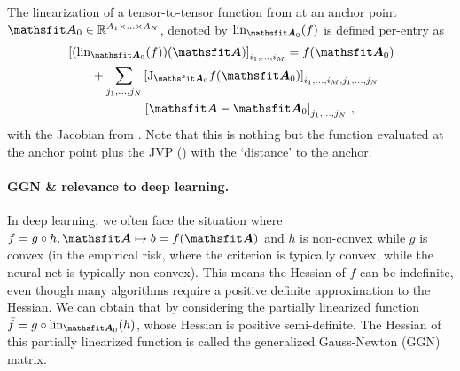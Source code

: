 \switchcolumn[1]
\switchcolumn[0]

\begin{definition}\label{def:tensor_linearization}
  The linearization of a tensor-to-tensor function from  at an anchor point $\tA_0 \in \sR^{A_1 \times \ldots \times A_N}$, denoted by $\lin_{\tA_0}(f)$ is defined per-entry as
  \begin{align*}
    & \left[
      (\lin_{\tA_0}(f))(\tA)
      \right]_{i_1, \ldots, i_M} = f(\tA_0)
    \\
    & \hspace{2em}+
      \sum_{j_1, \ldots, j_N}
      \left[
      \jac_{\tA_0}f(\tA_0)
      \right]_{i_1, \ldots, i_M, j_1, \ldots, j_N}
    \\
    & \hspace{6.2em}\left[
      \tA - \tA_0
      \right]_{j_1, \ldots, j_N}\,,
  \end{align*}
  with the Jacobian from . Note that this is nothing but the function evaluated at the anchor point plus the JVP () with the `distance' to the anchor.
\end{definition}

\paragraph{GGN \& relevance to deep learning.}
In deep learning, we often face the situation where $f = g \circ h, \tA \mapsto b = f(\tA)$ and $h$ is non-convex while $g$ is convex
(\eg in the empirical risk, where the criterion is typically convex, while the neural net is typically non-convex).
This means the Hessian of $f$ can be indefinite, even though many algorithms require a positive definite approximation to the Hessian.
We can obtain that by considering the partially linearized function $\bar{f} = g \circ \lin_{\tA_0}(h)$, whose Hessian is positive semi-definite.
The Hessian of this partially linearized function is called the generalized Gauss-Newton (GGN) matrix.

